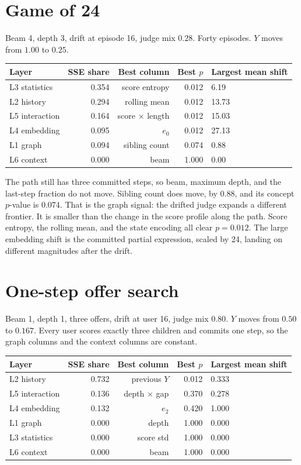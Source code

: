 \documentclass[11pt,a4paper]{article}
\begin{document}
\section{Game of 24}
Beam 4, depth 3, drift at episode 16, judge mix \(0.28\).
Forty episodes.
\(Y\) moves from \(1.00\) to \(0.25\).

\begin{center}
\begin{tabular}{lrrrl}
\toprule
Layer & SSE share & Best column & Best \(p\) & Largest mean shift \\
\midrule
L3 statistics & 0.354 & score entropy & 0.012 & 6.19 \\
L2 history & 0.294 & rolling mean & 0.012 & 13.73 \\
L5 interaction & 0.164 & score \(\times\) length & 0.012 & 15.03 \\
L4 embedding & 0.095 & \(e_0\) & 0.012 & 27.13 \\
L1 graph & 0.094 & sibling count & 0.074 & 0.88 \\
L6 context & 0.000 & beam & 1.000 & 0.00 \\
\bottomrule
\end{tabular}
\end{center}

The path still has three committed steps, so beam, maximum depth, and the last-step fraction do not move.
Sibling count does move, by \(0.88\), and its concept \(p\)-value is \(0.074\).
That is the graph signal: the drifted judge expands a different frontier.
It is smaller than the change in the score profile along the path.
Score entropy, the rolling mean, and the state encoding all clear \(p=0.012\).
The large embedding shift is the committed partial expression, scaled by 24, landing on different magnitudes after the drift.

\section{One-step offer search}
Beam 1, depth 1, three offers, drift at user 16, judge mix \(0.80\).
\(Y\) moves from \(0.50\) to \(0.167\).
Every user scores exactly three children and commits one step, so the graph columns and the context columns are constant.

\begin{center}
\begin{tabular}{lrrrl}
\toprule
Layer & SSE share & Best column & Best \(p\) & Largest mean shift \\
\midrule
L2 history & 0.732 & previous \(Y\) & 0.012 & 0.333 \\
L5 interaction & 0.136 & depth \(\times\) gap & 0.370 & 0.278 \\
L4 embedding & 0.132 & \(e_2\) & 0.420 & 1.000 \\
L1 graph & 0.000 & depth & 1.000 & 0.000 \\
L3 statistics & 0.000 & score std & 1.000 & 0.000 \\
L6 context & 0.000 & beam & 1.000 & 0.000 \\
\bottomrule
\end{tabular}
\end{center}
\end{document}
